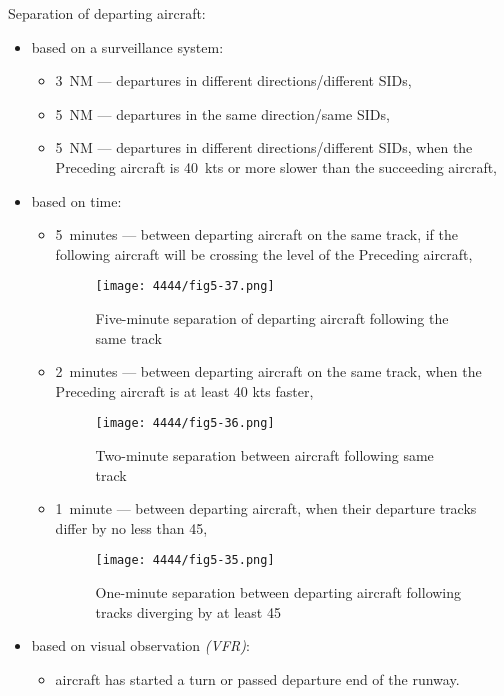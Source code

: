 \clearpage
Separation of departing aircraft:
\begin{itemize}
    \item based on a surveillance system:
    \begin{itemize}
        \item 3~NM --- departures in different directions/different SIDs,
        \item 5~NM --- departures in the same direction/same SIDs,
        \item 5~NM --- departures in different directions/different SIDs, when the Preceding aircraft is 40~kts or more slower than the succeeding aircraft,
    \end{itemize}
    \item based on time:
    \begin{itemize}
        \item 5~minutes --- between departing aircraft on the same track, if the following aircraft will be crossing the level of the Preceding aircraft,
        \begin{figure}[htbp]
            \centering
            \texttt{[image: 4444/fig5-37.png]}
            \caption{Five-minute separation of departing aircraft following the same track~\cite{4444}}
            \label{fig:5min_departures}
        \end{figure}
        \item 2~minutes --- between departing aircraft on the same track, when the Preceding aircraft is at least 40 kts faster,
        \begin{figure}[htbp]
            \centering
            \texttt{[image: 4444/fig5-36.png]}
            \caption{Two-minute separation between aircraft following same track~\cite{4444}}
            \label{fig:2min_departures}
        \end{figure}
        \item 1~minute --- between departing aircraft, when their departure tracks differ by no less than 45{\degree},
        \begin{figure}[htbp]
            \centering
            \texttt{[image: 4444/fig5-35.png]}
            \caption{One-minute separation between departing aircraft following tracks diverging by at least 45\degree~\cite{4444}}
            \label{fig:1min_departures}
        \end{figure}
    \end{itemize}
    \item based on visual observation \emph{(VFR)}:
    \begin{itemize}
        \item aircraft has started a turn or passed departure end of the runway.
    \end{itemize}
\end{itemize}

